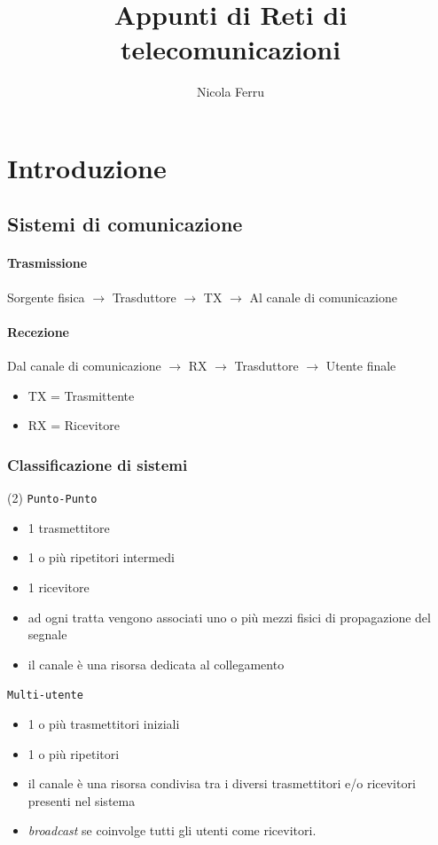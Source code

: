 \documentclass{book}
\title{Appunti di Reti di telecomunicazioni}
\author{Nicola Ferru}
\date{}
\begin{document}
\maketitle
\tableofcontents
\listoftables
\listoffigures
\chapter{Introduzione}

\section{Sistemi di comunicazione}
\subsubsection{Trasmissione}
Sorgente fisica $\to$ Trasduttore $\to$ TX $\to$ Al canale di comunicazione
\subsubsection{Recezione}
Dal canale di comunicazione $\to$ RX $\to$ Trasduttore $\to$ Utente finale
\begin{itemize}
	\item TX = Trasmittente
	\item RX = Ricevitore
\end{itemize}
\subsection{Classificazione di sistemi}
\begin{tasks}(2)
	\task \texttt{Punto-Punto}
	\begin{itemize}
		\item 1 trasmettitore
		\item 1 o più ripetitori intermedi
		\item 1 ricevitore
		\item ad ogni tratta vengono associati uno o più mezzi fisici di
			propagazione del segnale
		\item il canale è una risorsa dedicata al collegamento
	\end{itemize}
	\task \texttt{Multi-utente}
	\begin{itemize}
		\item 1 o più trasmettitori iniziali
		\item 1 o più ripetitori
		\item il canale è una risorsa condivisa tra i diversi trasmettitori e/o
			ricevitori presenti nel sistema
		\item \textit{broadcast} se coinvolge tutti gli utenti come ricevitori.
	\end{itemize}
\end{tasks}
\end{document}

